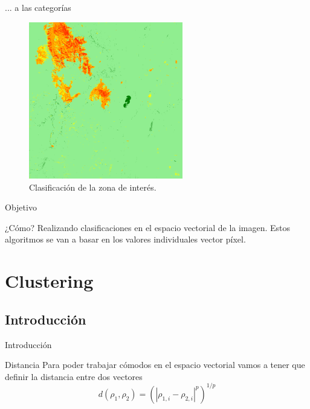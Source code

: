 \documentclass[]{beamer}
\begin{document}
\begin{frame}{... a las categorías}
  \begin{figure}
  \includegraphics[width=0.6\textwidth]{imagenes/im_class.png}
  \caption{Clasificación de la zona de interés.}
\end{figure}
\end{frame}

\begin{frame}{Objetivo}
  \begin{exampleblock}{¿Cómo?}
    Realizando clasificaciones en el espacio vectorial de la imagen. Estos algoritmos se van a basar en los valores individuales vector píxel.
  \end{exampleblock}
\end{frame}

\section{Clustering}

\subsection{Introducción}

\begin{frame}{Introducción}
  \begin{block}{Distancia}
    Para poder trabajar cómodos en el espacio vectorial vamos a tener que definir la distancia entre dos vectores
    \begin{equation}
    d(\rho_1, \rho_2) = \left( | \rho_{1,i} - \rho_{2,i} |^p \right)^{1/p}
    \end{equation}
  \end{block}
\end{frame}
\end{document}
